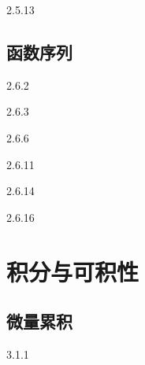   {2.5.13}

   
\begin{solution}

\end{solution}

\subsection{函数序列}
  {2.6.2}

   
\begin{solution}

\end{solution}




  {2.6.3}

   
\begin{solution}

\end{solution}


  {2.6.6}

   
\begin{solution}

\end{solution}



  {2.6.11}

   
\begin{solution}

\end{solution}


  {2.6.14}

   
\begin{solution}

\end{solution}


  {2.6.16}

   
\begin{solution}

\end{solution}

    
\section{积分与可积性}
\subsection{微量累积}
  {3.1.1}

